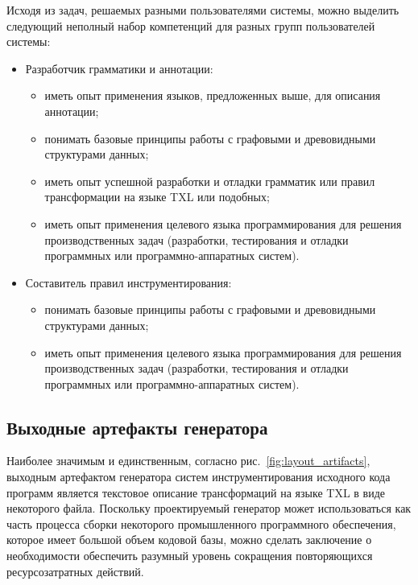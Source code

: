 Исходя из задач, решаемых разными пользователями системы, можно выделить следующий неполный набор компетенций для разных групп пользователей системы:

\begin{itemize}[noitemsep]
  \item Разработчик грамматики и аннотации:
    \begin{itemize}[noitemsep]
      \item иметь опыт применения языков, предложенных выше, для описания аннотации;
      \item понимать базовые принципы работы с графовыми и древовидными структурами данных;
      \item иметь опыт успешной разработки и отладки грамматик или правил трансформации на языке TXL или подобных;
      \item иметь опыт применения целевого языка программирования для решения производственных задач (разработки, тестирования и отладки программных или программно-аппаратных систем).
    \end{itemize}

  \item Составитель правил инструментирования:
    \begin{itemize}[noitemsep]
      \item понимать базовые принципы работы с графовыми и древовидными структурами данных;
      \item иметь опыт применения целевого языка программирования для решения производственных задач (разработки, тестирования и отладки программных или программно-аппаратных систем).
    \end{itemize}
\end{itemize}

\subsection{Выходные артефакты генератора}

Наиболее значимым и единственным, согласно рис.~\ref{fig:layout_artifacts}, выходным артефактом генератора систем инструментирования исходного кода программ является текстовое описание трансформаций на языке TXL в виде некоторого файла.
Поскольку проектируемый генератор может использоваться как часть процесса сборки некоторого промышленного программного обеспечения, которое имеет большой объем кодовой базы, можно сделать заключение о необходимости обеспечить разумный уровень сокращения повторяющихся ресурсозатратных действий.

